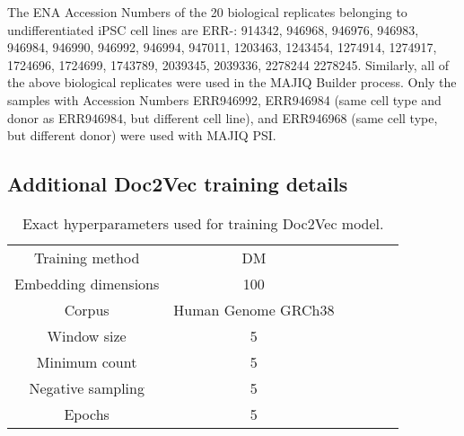 The ENA Accession Numbers of the 20 biological replicates belonging to undifferentiated iPSC cell lines \cite{hipsci} are ERR-: 
914342, 946968, 946976, 946983, 946984, 946990, 946992, 946994, 947011, 1203463, 1243454, 1274914, 1274917, 1724696, 1724699, 1743789, 2039345, 2039336, 2278244 2278245.
Similarly, all of the above biological replicates were used in the MAJIQ Builder process. Only the samples with Accession Numbers ERR946992, ERR946984 (same cell type and donor as ERR946984, but different cell line), and ERR946968 (same cell type, but different donor) were used with MAJIQ PSI. 
%
%
%
%
%
%
%
%

%
%
%
%
%
%
%
%
%

\subsection{Additional Doc2Vec training details} \label{app:d2v}

\begin{table}[h!]
	\centering
	\begin{tabular}{ c c c  c c c} 
		\hline
		Training method & DM \\
		Embedding dimensions & 100 \\
		Corpus & Human Genome GRCh38 \\
		Window size & 5\\
		Minimum count & 5\\
		Negative sampling & 5\\
		Epochs & 5\\
		
		\hline
	\end{tabular}
	\caption{Exact hyperparameters used for training Doc2Vec model.
	}
	\label{table:d2vparams}
\end{table}

